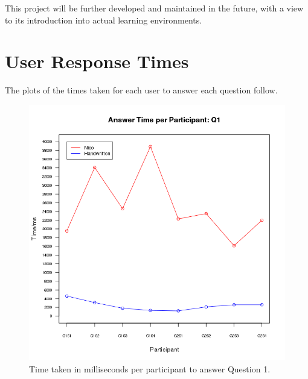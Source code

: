 \documentclass[12pt,twoside,notitlepage,xetex]{report}
\begin{document}
This project will be further developed and maintained in the future, with a view to its introduction into actual learning environments.




\cleardoublepage



\cleardoublepage

\appendix

\chapter{User Response Times}

The plots of the times taken for each user to answer each question follow.

\begin{center}
\begin{figure}[H]
\begin{center}
\includegraphics[height=\textheight/2-2cm]{figs/graphs/q1.png}
\end{center}
\caption{Time taken in milliseconds per participant to answer Question 1.}
\end{figure}
\end{center}
\end{document}
